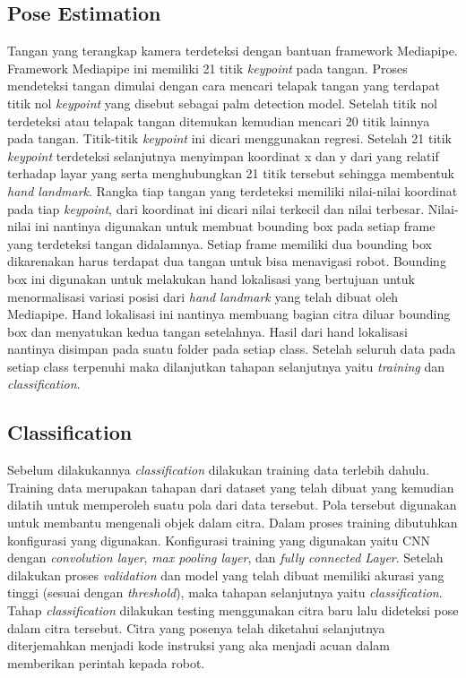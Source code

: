 \documentclass[conference]{IEEEtran}
\begin{document}
\subsection{Pose Estimation}
Tangan yang terangkap kamera terdeteksi dengan bantuan framework Mediapipe. Framework Mediapipe ini memiliki 21 titik  \emph{keypoint} pada tangan. Proses mendeteksi tangan dimulai dengan cara mencari telapak tangan yang terdapat titik nol \emph{keypoint} yang disebut sebagai palm detection model. Setelah titik nol terdeteksi atau telapak tangan ditemukan kemudian mencari 20 titik lainnya pada tangan. Titik-titik \emph{keypoint} ini dicari menggunakan regresi. Setelah 21 titik \emph{keypoint} terdeteksi selanjutnya menyimpan koordinat x dan y dari yang relatif terhadap layar yang serta menghubungkan 21 titik tersebut sehingga membentuk \emph{hand landmark}. Rangka tiap tangan yang terdeteksi memiliki nilai-nilai koordinat pada tiap \emph{keypoint}, dari koordinat ini dicari nilai terkecil dan nilai terbesar.  Nilai-nilai ini nantinya digunakan untuk membuat bounding box pada setiap frame yang terdeteksi tangan didalamnya. Setiap frame memiliki dua bounding box dikarenakan harus terdapat dua tangan untuk bisa menavigasi robot. Bounding box ini digunakan untuk melakukan hand lokalisasi yang bertujuan untuk menormalisasi variasi posisi dari \emph{hand landmark} yang telah dibuat oleh Mediapipe. Hand lokalisasi ini nantinya membuang bagian citra diluar bounding box dan menyatukan kedua tangan setelahnya. Hasil dari hand lokalisasi nantinya disimpan pada suatu folder pada setiap class. Setelah seluruh data pada setiap class terpenuhi maka dilanjutkan tahapan selanjutnya yaitu \emph{training} dan \emph{classification}.

\subsection{Classification}
Sebelum dilakukannya \emph{classification} dilakukan training data terlebih dahulu. Training data merupakan tahapan dari dataset yang telah dibuat yang kemudian dilatih untuk memperoleh suatu pola dari data tersebut. Pola tersebut digunakan untuk membantu mengenali objek dalam citra. Dalam proses training dibutuhkan konfigurasi yang digunakan. Konfigurasi training yang digunakan yaitu CNN dengan \emph{convolution layer}, \emph{max pooling layer}, dan \emph{fully connected Layer}. Setelah dilakukan proses \emph{validation} dan model yang telah dibuat memiliki akurasi yang tinggi (sesuai dengan \emph{threshold}), maka tahapan selanjutnya yaitu \emph{classification}. Tahap \emph{classification} dilakukan testing menggunakan citra baru lalu dideteksi pose dalam citra tersebut. Citra yang posenya telah diketahui selanjutnya diterjemahkan menjadi kode instruksi yang aka menjadi acuan dalam memberikan perintah kepada robot.
\end{document}
